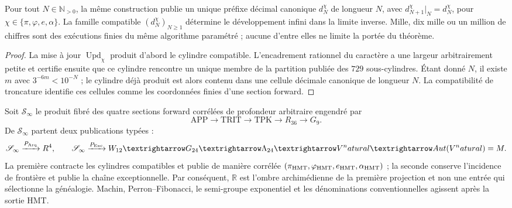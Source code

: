 \begin{corollary}
\label{cor:generacion-nonadica-profundidad-arbitraria-rev10}
Pour tout \(N\in\mathbb N_{>0}\), la même construction publie un unique
préfixe décimal canonique \(d_N^\chi\) de longueur \(N\), avec
\(d_{N+1}^\chi|_N=d_N^\chi\), pour
\(\chi\in\{\pi,\varphi,e,\alpha\}\). La famille compatible
\((d_N^\chi)_{N\ge1}\) détermine le développement infini dans la limite
inverse. Mille, dix mille ou un million de chiffres sont des exécutions finies du
même algorithme paramétré ; aucune d'entre elles ne limite la portée du
théorème.
\end{corollary}

\begin{proof}
La mise à jour \(\operatorname{Upd}_\chi\) produit d'abord le cylindre
compatible. L'encadrement rationnel du caractère a une largeur arbitrairement
petite et certifie ensuite que ce cylindre rencontre un unique membre de
la partition publiée des \(729\) sous-cylindres. Étant donné \(N\), il existe \(m\) avec
\(3^{-6m}<10^{-N}\) ; le cylindre déjà produit est alors contenu dans une
cellule décimale canonique de longueur \(N\). La compatibilité de troncature
identifie ces cellules comme les coordonnées finies d'une section forward.
\end{proof}

\begin{theorem}
\label{thm:estado-coinductivo-doble-proyeccion-rev10}
Soit \(\mathscr S_\infty\) le produit fibré des quatre sections
forward corrélées de profondeur arbitraire engendré par
\[
 \mathrm{APP}\longrightarrow\mathrm{TRIT}\longrightarrow\mathrm{TPK}
 \longrightarrow R_{36}\longrightarrow G_9.
\]
De \(\mathscr S_\infty\) partent deux publications typées :
\[
 \mathscr S_\infty\xrightarrow{\mathcal P_{\rm Arq}}\mathbb R^4,
 \qquad
 \mathscr S_\infty\xrightarrow{\mathcal P_{\rm Exc}}
 W_{12}\longrightarrow G_{24}\longrightarrow\Lambda_{24}
 \longrightarrow V^\natural
 \longrightarrow\operatorname{Aut}(V^\natural)=\mathbb M.
\]
La première contracte les cylindres compatibles et publie de manière corrélée
\((\pi_{\rm HMT},\varphi_{\rm HMT},e_{\rm HMT},\alpha_{\rm HMT})\) ; la
seconde conserve l'incidence de frontière et publie la chaîne exceptionnelle.
Par conséquent, \(\mathbb R\) est l'ombre archimédienne de la première
projection et non une entrée qui sélectionne la généalogie. Machin,
Perron--Fibonacci, le semi-groupe exponentiel et les dénominations
conventionnelles agissent après la sortie HMT.
\end{theorem}


